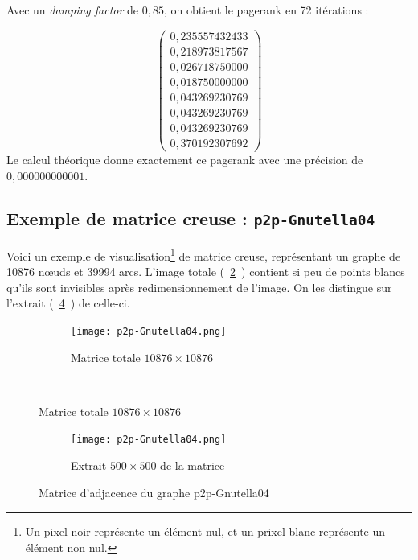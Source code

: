 \documentclass[a4paper,12pt]{article}
\begin{document}
\bigskip

Avec un \textit{damping factor} de $0,85$, on obtient le pagerank en 72 itérations :

$$
  \begin{pmatrix}
    0,235557432433 \\
    0,218973817567 \\
    0,026718750000 \\
    0,018750000000 \\
    0,043269230769 \\
    0,043269230769 \\
    0,043269230769 \\
    0,370192307692
  \end{pmatrix}
$$
Le calcul théorique donne exactement ce pagerank avec une précision de $0,000000000001$.

\bigskip

\subsection{Exemple de matrice creuse : \texttt{p2p-Gnutella04}}

Voici un exemple de visualisation\footnote{Un pixel noir représente un élément nul, et un prixel blanc représente un élément non nul.} de matrice creuse, représentant un graphe de 10876 n\oe{}uds et 39994 arcs. L'image totale (~\ref{fig:matrice}~) contient si peu de points blancs qu'ils sont invisibles après redimensionnement de l'image. On les distingue sur l'extrait (~\ref{fig:sousmatrice}~) de celle-ci.

\bigskip

\begin{figure}[h] 
  \centering 
  \begin{subfigure}[c]{\linewidth}
    \centering
    \texttt{[image: p2p-Gnutella04.png]}
    \caption{Matrice totale $10876 \times 10876$}
    \label{fig:matrice}
  \end{subfigure} \\ \bigskip
\end{figure}
\begin{figure}
  \ContinuedFloat
  \begin{subfigure}[c]{\linewidth}
    \centering
    \texttt{[image: p2p-Gnutella04.png]}
    \caption{Extrait $500 \times 500$ de la matrice}
    \label{fig:sousmatrice}
  \end{subfigure}
  \bigskip
  \caption{Matrice d'adjacence du graphe p2p-Gnutella04}
\end{figure}
\end{document}
